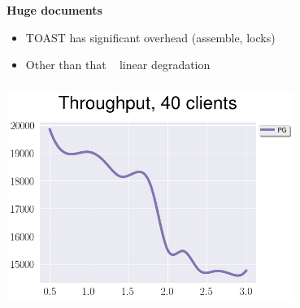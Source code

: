 \documentclass[usenames,dvipsnames, 18pt, compress, aspectratio=169]{beamer}
\begin{document}
\begin{frame}
    \frametitle{}
    \begin{center}
    \textbf{Huge documents}

        \begin{itemize}[label={\MVRightarrow}]
            \item TOAST has significant overhead (assemble, locks)
            \item Other than that ~ linear degradation
        \end{itemize}

    \end{center}
\end{frame}

\begin{frame}
    \frametitle{}
    \begin{center}

        \includegraphics[width=0.7\textwidth,center]{document_size.png}

    \end{center}
\end{frame}
\end{document}
